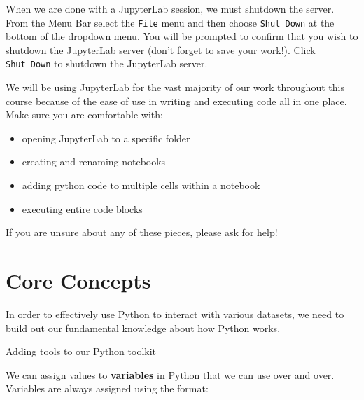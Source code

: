 \documentclass[
  letterpaper,
  DIV=11,
  numbers=noendperiod]{scrreprt}
\providecommand{\tightlist}{%
  \setlength{\itemsep}{0pt}\setlength{\parskip}{0pt}}\usepackage{longtable,booktabs,array}
\begin{document}
When we are done with a JupyterLab session, we must shutdown the server.
From the Menu Bar select the \texttt{File} menu and then choose
\texttt{Shut\ Down} at the bottom of the dropdown menu. You will be
prompted to confirm that you wish to shutdown the JupyterLab server
(don't forget to save your work!). Click \texttt{Shut\ Down} to shutdown
the JupyterLab server.

\begin{tcolorbox}[enhanced jigsaw, rightrule=.15mm, opacitybacktitle=0.6, colback=white, toprule=.15mm, colframe=quarto-callout-tip-color-frame, bottomtitle=1mm, bottomrule=.15mm, arc=.35mm, coltitle=black, breakable, title=\textcolor{quarto-callout-tip-color}{\faLightbulb}\hspace{0.5em}{JupyterLab and Us!}, titlerule=0mm, opacityback=0, colbacktitle=quarto-callout-tip-color!10!white, left=2mm, toptitle=1mm, leftrule=.75mm]
We will be using JupyterLab for the vast majority of our work throughout
this course because of the ease of use in writing and executing code all
in one place. Make sure you are comfortable with:

\begin{itemize}
\tightlist
\item
  opening JupyterLab to a specific folder
\item
  creating and renaming notebooks
\item
  adding python code to multiple cells within a notebook
\item
  executing entire code blocks
\end{itemize}

If you are unsure about any of these pieces, please ask for help!
\end{tcolorbox}


\hypertarget{core-concepts}{%
\chapter{Core Concepts}\label{core-concepts}}

In order to effectively use Python to interact with various datasets, we
need to build out our fundamental knowledge about how Python works.

Adding tools to our Python toolkit

We can assign values to \textbf{variables} in Python that we can use
over and over. Variables are always assigned using the format:
\end{document}
